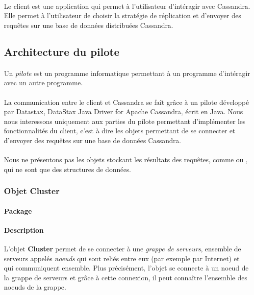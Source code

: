 \documentclass[12pt]{article}
\begin{document}
\paragraph{} Le client est une application qui permet à l'utilisateur d'intéragir avec Cassandra. 
Elle permet à l'utilisateur de choisir la stratégie de réplication et d'envoyer des requêtes sur une base de données distribuées Cassandra.


\subsection{Architecture du pilote}

\paragraph{} Un \textit{pilote} est un programme informatique permettant à un programme d'intéragir avec un autre programme.

\paragraph{} La communication entre le client et Cassandra se faît grâce à un pilote développé par Datastax, DataStax Java Driver for Apache Cassandra, écrit en Java.
Nous nous interessons uniquement aux parties du pilote permettant d'implémenter les fonctionnalités du client, c'est à dire les objets permettant de se connecter et d'envoyer des requêtes sur une base de données Cassandra.

\paragraph{} Nous ne présentons pas les objets stockant les résultats des requêtes, comme  ou , qui ne sont que des structures de données. 

\subsubsection{Objet Cluster}

\paragraph{Package}  

\paragraph{Description} L'objet \textbf{Cluster} permet de se connecter à une \textit{grappe de serveurs}, ensemble de serveurs appelés \textit{noeuds} qui sont reliés entre eux (par exemple par Internet) et qui communiquent ensemble.
Plus précisément, l'objet se connecte à un noeud de la grappe de serveurs et grâce à cette connexion, il peut connaître l'ensemble des noeuds de la grappe.
\end{document}
